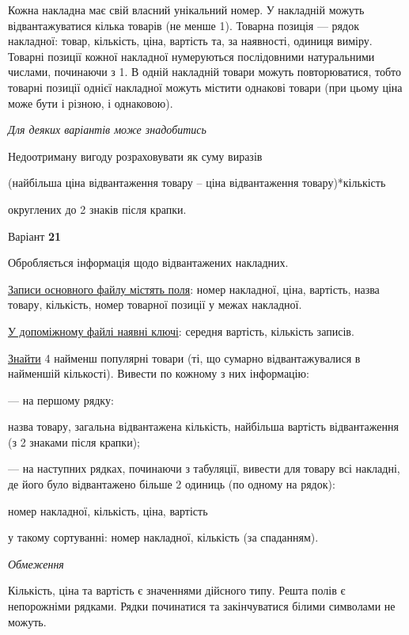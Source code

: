 \documentclass[11pt, ukrainian]{article}
\begin{document}
Кожна накладна має свій власний унікальний номер.
У накладній можуть відвантажуватися кілька товарів (не менше 1).
Товарна позиція --- рядок накладної: товар, кількість, ціна, вартість та, за наявності, одиниця виміру.
Товарні позиції кожної накладної нумеруються послідовними натуральними числами, починаючи з 1.
В одній накладній товари можуть повторюватися, 
тобто товарні позиції однієї накладної можуть містити однакові товари 
(при цьому ціна може бути і різною, і однаковою).

\bigskip\textit{Для деяких варіантів може знадобитись}

Недоотриману вигоду розраховувати як суму виразів
{\center (найбільша ціна відвантаження товару – ціна відвантаження товару)*кількість\par}

\bigskip
{\noindent} округлених до 2 знаків після крапки.


\par
\newpage
{\center Варіант  \No \textbf { 21 }\par}
\bigskip
Обробляється інформація щодо відвантажених накладних.

\underline{Записи основного файлу містять поля}: номер накладної, ціна, вартість, назва товару, кількість, номер товарної позиції у межах накладної.

\underline{У допоміжному файлі наявні ключі}: середня вартість, кількість записів.

\underline{Знайти} 4 найменш популярні товари (ті, що сумарно відвантажувалися в найменшій кількості). Вивести по кожному з них інформацію:\par
{\noindent}--- на першому рядку:\par
назва товару, загальна відвантажена кількість, найбільша вартість відвантаження (з 2 знаками після крапки);

{\noindent}--- на наступних рядках, починаючи з табуляції, вивести для товару всі накладні, де його було відвантажено більше 2 одиниць (по одному на рядок):\par
номер накладної, кількість, ціна, вартість

{\noindent}у такому сортуванні: номер накладної, кількість (за спаданням).


\bigskip\textit{Обмеження}

Кількість, ціна та вартість є значеннями дійсного типу.
Решта полів є непорожніми рядками.
Рядки починатися та закінчуватися білими символами не можуть.
\end{document}
